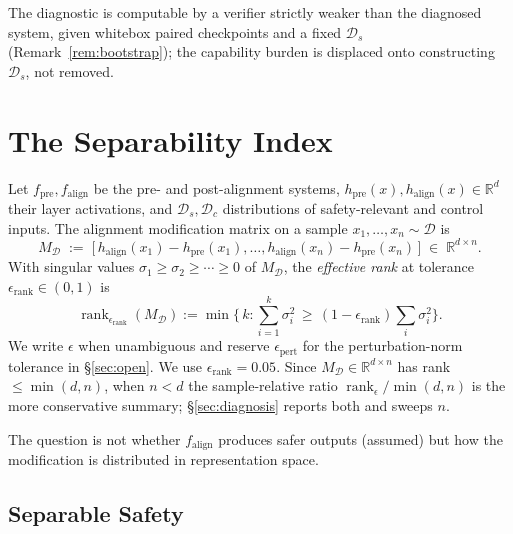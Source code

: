 \documentclass[10pt]{article}
\theoremstyle{definition}
\theoremstyle{remark}
\begin{document}
The diagnostic is computable by a verifier strictly
weaker than the diagnosed system, given whitebox
paired checkpoints and a fixed $\mathcal{D}_s$
(Remark~\ref{rem:bootstrap}); the capability burden is
displaced onto constructing $\mathcal{D}_s$, not
removed.


\section{The Separability Index}
\label{sec:two_modes}

Let $f_{\mathrm{pre}}, f_{\mathrm{align}}$ be the
pre- and post-alignment systems, $h_{\mathrm{pre}}(x),
h_{\mathrm{align}}(x) \in \mathbb{R}^d$ their layer
activations, and $\mathcal{D}_s, \mathcal{D}_c$
distributions of safety-relevant and control inputs.
The alignment modification matrix on a sample
$x_1,\ldots,x_n \sim \mathcal{D}$ is
\begin{equation}
  M_{\mathcal{D}}
  \;:=\;
  \bigl[\,
    h_{\mathrm{align}}(x_1) - h_{\mathrm{pre}}(x_1),
    \ldots,
    h_{\mathrm{align}}(x_n) - h_{\mathrm{pre}}(x_n)
  \,\bigr]
  \;\in\; \mathbb{R}^{d \times n}.
  \label{eq:modification}
\end{equation}
With singular values $\sigma_1 \geq \sigma_2 \geq \cdots
\geq 0$ of $M_{\mathcal{D}}$, the \emph{effective rank}
at tolerance $\epsilon_{\mathrm{rank}} \in (0,1)$ is
\begin{equation}
  \operatorname{rank}_{\epsilon_{\mathrm{rank}}}(M_{\mathcal{D}})
  := \min\bigl\{\, k :
    \textstyle\sum_{i=1}^{k} \sigma_i^2
    \,\geq\, (1 - \epsilon_{\mathrm{rank}})
    \textstyle\sum_i \sigma_i^2 \bigr\}.
  \label{eq:effrank}
\end{equation}
We write $\epsilon$ when unambiguous and reserve
$\epsilon_{\mathrm{pert}}$ for the perturbation-norm
tolerance in \S\ref{sec:open}.  We use
$\epsilon_{\mathrm{rank}} = 0.05$.  Since
$M_{\mathcal{D}} \in \mathbb{R}^{d\times n}$ has rank
$\leq \min(d, n)$, when $n < d$ the sample-relative
ratio $\operatorname{rank}_{\epsilon}/\min(d, n)$ is
the more conservative summary; \S\ref{sec:diagnosis}
reports both and sweeps $n$.

The question is not whether $f_{\mathrm{align}}$
produces safer outputs (assumed) but how the
modification is distributed in representation space.

\subsection{Separable Safety}
\label{sec:constraint}
\end{document}
